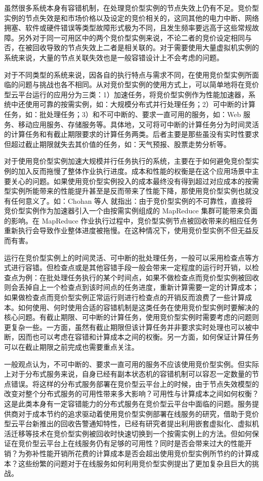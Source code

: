 虽然很多系统本身有容错机制，在处理竞价型实例的节点失效上仍有不足。竞价型实例的节点失效是和市场价格以及设定的竞价相关的，这同其他的电力中断、网络拥塞、软件或硬件错误等类型故障形式极为不同，且发生频率要远高于这些常规故障。另外对于同一可用区中的两个竞价型实例来说，不论二者的竞价设定相同与否，在被回收导致的节点失效上二者是相关联的。对于需要使用大量虚拟机实例的系统来说，大量的节点关联失效也是一般容错设计上不会考虑的问题。

对于不同类型的系统来说，因各自的执行特点与需求不同，在使用竞价型实例所面临的问题与挑战也各不相同。从对竞价型实例的使用方式上，可以简单地将在竞价型云平台运行的应用分为三类：1）加速任务，将竞价型实例作为性能加速器，系统中还使用可靠的按需实例，如：大规模分布式并行处理任务；2）可中断的计算任务，如：批处理任务；3）和不可中断的、要求一直可用的服务，如：Web 服务、移动应用服务、存储服务等。具体地，又可将可中断的计算任务分为时间灵活的计算任务和有截止期限要求的计算任务两类。后者主要是那些虽没有实时性要求但超过截止期限就失去其价值的任务，如：天气预报、股票走势分析等。

对于使用竞价型实例加速大规模并行任务执行的系统，主要在于如何避免竞价型实例的加入反而拖慢了整体作业执行进度。成本和性能的权衡是在这个应用场景中主要关心的问题。如果使用竞价型实例投入的成本最终没有得到超过对应成本的按需型实例所能带来的性能提升甚至是反而带来了性能下降，那使用竞价型实例也就没有任何意义了。如：Chohan 等人 \cite{chohan2010see} 就指出：由于竞价型实例的不可靠性，直接将竞价型实例作为加速器引入一个由按需实例组成的 MapReduce 集群可能带来负面的影响。在 MapReduce 作业执行过程中，竞价型实例节点被回收带来的相应任务重新执行会导致作业整体进度被拖慢。在这种情况下，使用竞价型实例不但无益反而有害。

运行在竞价型实例上的时间灵活、可中断的批处理任务，一般可以采用检查点等方式进行容错。但检查点或是其他容错手段一般会带来一定程度的运行时开销，以检查点为例：在批处理任务执行的某个时间点，如果不做检查点而竞价型实例被回收则会丢掉自上一个检查点到该时间点的任务进度，重新计算需要一定的计算成本；如果做检查点而竞价型实例正常运行则进行检查点的开销反而浪费了一些计算成本。如何使用、何时使用合适的容错机制是这类任务在使用竞价型实例时要解决的核心问题。有截止期限、可中断的计算任务，使用竞价型实例时需要考虑的问题则更复杂一些。一方面，虽然有截止期限但该计算任务并非要求实时处理也可以被中断，因而也可以考虑在容错和计算成本之间的权衡。另一方面，如何保证计算任务可以在截止期限之前完成也需要重点关注。

一般观点认为，不可中断的、要求一直可用的服务不应该使用竞价型实例。但实际上对于分布式服务来说，自身已经有副本状态机的容错机制可以容忍一定数量的节点错误。将这样的分布式服务部署在竞价型云平台上的时候，由于节点失效模型的改变对整个分布式服务的可用性带来多大影响？可用性与计算成本之间如何权衡？这是此类本身有一定容错能力的分布式服务在竞价型云平台中面临的问题。服务提供商对于成本节约的追求驱动着使用竞价型实例部署在线服务的研究，借助于竞价型云平台新推出的回收告警通知特性，已经有研究者提出利用嵌套虚拟化、虚拟机活迁移等技术在竞价型实例被回收时快速切换到一个按需实例上的方法。但如何保证在竞价型云平台上在线服务仍有足够的可用性？同时是否会带来过大的性能开销？为弥补性能开销所花费的计算成本是否会超出使用竞价型实例所节约的计算成本？这些纷繁的问题对于在线服务如何利用竞价型实例提出了更加复杂且巨大的挑战。


